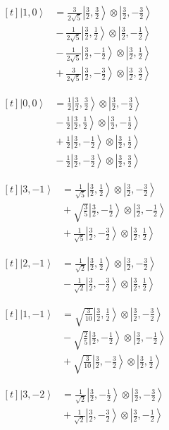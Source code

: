 \documentclass[11pt,a4paper]{article}
\newcommand{\estadocelda}[1]{%
  \begin{minipage}[t]{0.48\linewidth}
  \small\raggedright
  \(\displaystyle\begin{aligned}[t]#1\end{aligned}\)
  \end{minipage}%
}
\newcommand{\ket}[1]{\left|#1\right\rangle}
\begin{document}
\noindent\estadocelda{
\ket{1,0} &= \frac{3}{2\sqrt{5}}\ket{\frac{3}{2},\frac{3}{2}}\otimes\ket{\frac{3}{2},-\frac{3}{2}} \\
 &{}-\frac{1}{2\sqrt{5}}\ket{\frac{3}{2},\frac{1}{2}}\otimes\ket{\frac{3}{2},-\frac{1}{2}} \\
 &{}-\frac{1}{2\sqrt{5}}\ket{\frac{3}{2},-\frac{1}{2}}\otimes\ket{\frac{3}{2},\frac{1}{2}} \\
 &{}+\frac{3}{2\sqrt{5}}\ket{\frac{3}{2},-\frac{3}{2}}\otimes\ket{\frac{3}{2},\frac{3}{2}}
}\hfill\estadocelda{
\ket{0,0} &= \frac{1}{2}\ket{\frac{3}{2},\frac{3}{2}}\otimes\ket{\frac{3}{2},-\frac{3}{2}} \\
 &{}-\frac{1}{2}\ket{\frac{3}{2},\frac{1}{2}}\otimes\ket{\frac{3}{2},-\frac{1}{2}} \\
 &{}+\frac{1}{2}\ket{\frac{3}{2},-\frac{1}{2}}\otimes\ket{\frac{3}{2},\frac{1}{2}} \\
 &{}-\frac{1}{2}\ket{\frac{3}{2},-\frac{3}{2}}\otimes\ket{\frac{3}{2},\frac{3}{2}}
}\par\addvspace{1.4em}

\noindent\estadocelda{
\ket{3,-1} &= \frac{1}{\sqrt{5}}\ket{\frac{3}{2},\frac{1}{2}}\otimes\ket{\frac{3}{2},-\frac{3}{2}} \\
 &{}+\sqrt{\frac{3}{5}}\ket{\frac{3}{2},-\frac{1}{2}}\otimes\ket{\frac{3}{2},-\frac{1}{2}} \\
 &{}+\frac{1}{\sqrt{5}}\ket{\frac{3}{2},-\frac{3}{2}}\otimes\ket{\frac{3}{2},\frac{1}{2}}
}\hfill\estadocelda{
\ket{2,-1} &= \frac{1}{\sqrt{2}}\ket{\frac{3}{2},\frac{1}{2}}\otimes\ket{\frac{3}{2},-\frac{3}{2}} \\
 &{}-\frac{1}{\sqrt{2}}\ket{\frac{3}{2},-\frac{3}{2}}\otimes\ket{\frac{3}{2},\frac{1}{2}}
}\par\addvspace{1.4em}

\noindent\estadocelda{
\ket{1,-1} &= \sqrt{\frac{3}{10}}\ket{\frac{3}{2},\frac{1}{2}}\otimes\ket{\frac{3}{2},-\frac{3}{2}} \\
 &{}-\sqrt{\frac{2}{5}}\ket{\frac{3}{2},-\frac{1}{2}}\otimes\ket{\frac{3}{2},-\frac{1}{2}} \\
 &{}+\sqrt{\frac{3}{10}}\ket{\frac{3}{2},-\frac{3}{2}}\otimes\ket{\frac{3}{2},\frac{1}{2}}
}\hfill\estadocelda{
\ket{3,-2} &= \frac{1}{\sqrt{2}}\ket{\frac{3}{2},-\frac{1}{2}}\otimes\ket{\frac{3}{2},-\frac{3}{2}} \\
 &{}+\frac{1}{\sqrt{2}}\ket{\frac{3}{2},-\frac{3}{2}}\otimes\ket{\frac{3}{2},-\frac{1}{2}}
}\par\addvspace{1.4em}
\end{document}
